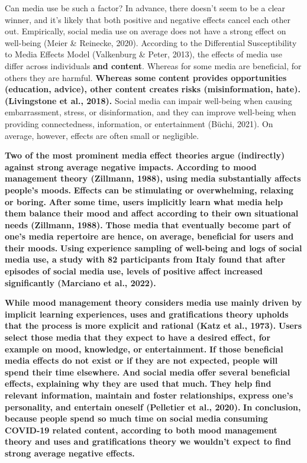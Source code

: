 \documentclass[
  man,mask]{apa7}
\begin{document}
Can media use be such a factor?
In advance, there doesn't seem to be a clear winner, and it's likely that both positive and negative effects cancel each other out.
Empirically, social media use on average does not have a strong effect on well-being (Meier \& Reinecke, 2020).
According to the Differential Susceptibility to Media Effects Model (Valkenburg \& Peter, 2013), the effects of media use differ across individuals \textbf{and content}.
Whereas for some media are beneficial, for others they are harmful.
\textbf{Whereas some content provides opportunities (education, advice), other content creates risks (misinformation, hate). (Livingstone et al., 2018).}
Social media can impair well-being when causing embarrassment, stress, or disinformation, and they can improve well-being when providing connectedness, information, or entertainment (Büchi, 2021).
On average, however, effects are often small or negligible.

\textbf{Two of the most prominent media effect theories argue (indirectly) against strong average negative impacts.}
\textbf{According to mood management theory (Zillmann, 1988), using media substantially affects people's moods.}
\textbf{Effects can be stimulating or overwhelming, relaxing or boring.}
\textbf{After some time, users implicitly learn what media help them balance their mood and affect according to their own situational needs (Zillmann, 1988).}
\textbf{Those media that eventually become part of one's media repertoire are hence, on average, beneficial for users and their moods.}
\textbf{Using experience sampling of well-being and logs of social media use, a study with 82 participants from Italy found that after episodes of social media use, levels of positive affect increased significantly (Marciano et al., 2022).}

\textbf{While mood management theory considers media use mainly driven by implicit learning experiences, uses and gratifications theory upholds that the process is more explicit and rational (Katz et al., 1973).}
\textbf{Users select those media that they expect to have a desired effect, for example on mood, knowledge, or entertainment.}
\textbf{If those beneficial media effects do not exist or if they are not expected, people will spend their time elsewhere.}
\textbf{And social media offer several beneficial effects, explaining why they are used that much.}
\textbf{They help find relevant information, maintain and foster relationships, express one's personality, and entertain oneself (Pelletier et al., 2020).}
\textbf{In conclusion, because people spend so much time on social media consuming COVID-19 related content, according to both mood management theory and uses and gratifications theory we wouldn't expect to find strong average negative effects.}
\end{document}
